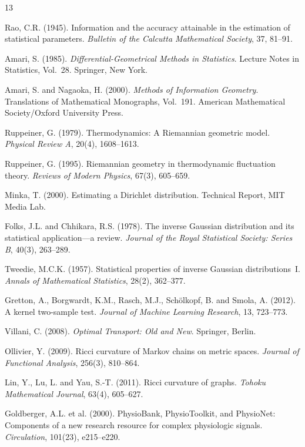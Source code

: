 \documentclass[12pt]{article}
\begin{document}
\begin{thebibliography}{13}

Rao, C.R. (1945).
Information and the accuracy attainable in the estimation of statistical parameters.
\textit{Bulletin of the Calcutta Mathematical Society}, 37, 81--91.

Amari, S. (1985).
\textit{Differential-Geometrical Methods in Statistics}.
Lecture Notes in Statistics, Vol.~28. Springer, New York.

Amari, S. and Nagaoka, H. (2000).
\textit{Methods of Information Geometry}.
Translations of Mathematical Monographs, Vol.~191.
American Mathematical Society/Oxford University Press.

Ruppeiner, G. (1979).
Thermodynamics: A Riemannian geometric model.
\textit{Physical Review A}, 20(4), 1608--1613.

Ruppeiner, G. (1995).
Riemannian geometry in thermodynamic fluctuation theory.
\textit{Reviews of Modern Physics}, 67(3), 605--659.

Minka, T. (2000).
Estimating a Dirichlet distribution.
Technical Report, MIT Media Lab.

Folks, J.L. and Chhikara, R.S. (1978).
The inverse Gaussian distribution and its statistical application---a review.
\textit{Journal of the Royal Statistical Society: Series B}, 40(3), 263--289.

Tweedie, M.C.K. (1957).
Statistical properties of inverse Gaussian distributions~I.
\textit{Annals of Mathematical Statistics}, 28(2), 362--377.

Gretton, A., Borgwardt, K.M., Rasch, M.J., Sch\"{o}lkopf, B. and Smola, A. (2012).
A kernel two-sample test.
\textit{Journal of Machine Learning Research}, 13, 723--773.

Villani, C. (2008).
\textit{Optimal Transport: Old and New}.
Springer, Berlin.

Ollivier, Y. (2009).
Ricci curvature of Markov chains on metric spaces.
\textit{Journal of Functional Analysis}, 256(3), 810--864.

Lin, Y., Lu, L. and Yau, S.-T. (2011).
Ricci curvature of graphs.
\textit{Tohoku Mathematical Journal}, 63(4), 605--627.

Goldberger, A.L. et al. (2000).
PhysioBank, PhysioToolkit, and PhysioNet: Components of a new research resource
for complex physiologic signals.
\textit{Circulation}, 101(23), e215--e220.

\end{thebibliography}
\end{document}
